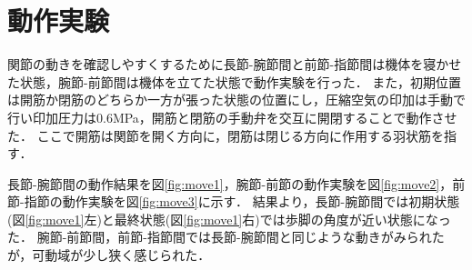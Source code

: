 \documentclass{jarticle}
\begin{document}
\section{動作実験}
関節の動きを確認しやすくするために長節-腕節間と前節-指節間は機体を寝かせた状態，腕節-前節間は機体を立てた状態で動作実験を行った．
また，初期位置は開筋か閉筋のどちらか一方が張った状態の位置にし，圧縮空気の印加は手動で行い印加圧力は0.6MPa，開筋と閉筋の手動弁を交互に開閉することで動作させた．
ここで開筋は関節を開く方向に，閉筋は閉じる方向に作用する羽状筋を指す．

長節-腕節間の動作結果を図\ref{fig:move1}，腕節-前節の動作実験を図\ref{fig:move2}，前節-指節の動作実験を図\ref{fig:move3}に示す．
結果より，長節-腕節間では初期状態(図\ref{fig:move1}左)と最終状態(図\ref{fig:move1}右)では歩脚の角度が近い状態になった．
腕節-前節間，前節-指節間では長節-腕節間と同じような動きがみられたが，可動域が少し狭く感じられた．
\end{document}
